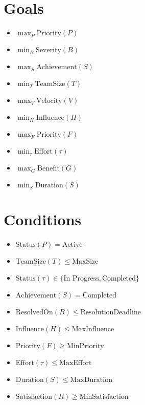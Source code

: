 \documentclass{article}
\begin{document}
\section{Goals}
\begin{itemize}
    \item $ \max_{P} \text{Priority}(P) $
    \item $ \min_{B} \text{Severity}(B) $
    \item $ \max_{S} \text{Achievement}(S) $
    \item $ \min_{T} \text{TeamSize}(T) $
    \item $ \max_{V} \text{Velocity}(V) $
    \item $ \min_{H} \text{Influence}(H) $
    \item $ \max_{F} \text{Priority}(F) $
    \item $ \min_{\tau} \text{Effort}(\tau) $
    \item $ \max_{G} \text{Benefit}(G) $
    \item $ \min_{S} \text{Duration}(S) $
\end{itemize}
\section{Conditions}
\begin{itemize}
    \item $ \text{Status}(P) = \text{Active} $
    \item $ \text{TeamSize}(T) \leq \text{MaxSize} $
    \item $ \text{Status}(\tau) \in \{\text{In Progress}, \text{Completed}\} $
    \item $ \text{Achievement}(S) = \text{Completed} $
    \item $ \text{ResolvedOn}(B) \leq \text{ResolutionDeadline} $
    \item $ \text{Influence}(H) \leq \text{MaxInfluence} $
    \item $ \text{Priority}(F) \geq \text{MinPriority} $
    \item $ \text{Effort}(\tau) \leq \text{MaxEffort} $
    \item $ \text{Duration}(S) \leq \text{MaxDuration} $
    \item $ \text{Satisfaction}(R) \geq \text{MinSatisfaction} $
\end{itemize}
\end{document}
